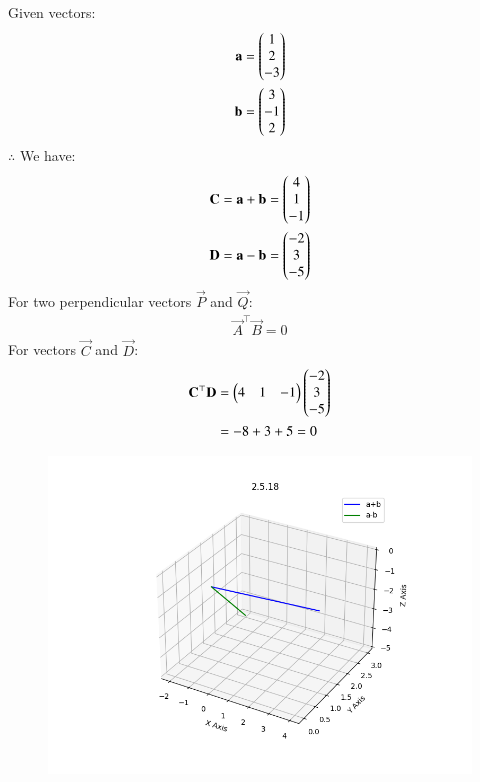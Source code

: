 \documentclass[journal,12pt,onecolumn]{IEEEtran}
\theoremstyle{remark}
\begin{document}
Given vectors:
\begin{align}
 \mathbf{a} &= \begin{pmatrix}1 \\ 2 \\ -3\end{pmatrix} \\
 \mathbf{b} &= \begin{pmatrix}3 \\ -1 \\ 2\end{pmatrix}
\end{align}
$\therefore$ We have:
\begin{align}
\mathbf{C} = \mathbf{a} + \mathbf{b} &= \begin{pmatrix}4 \\ 1 \\ -1\end{pmatrix} \\
\mathbf{D} = \mathbf{a} - \mathbf{b} &= \begin{pmatrix}-2 \\ 3 \\ -5\end{pmatrix}
\end{align}
For two perpendicular vectors $\vec{P}$ and $\vec{Q}$:
\begin{align}
 \vec{A}^\top\vec{B} = 0
\end{align}
For vectors $\vec{C}$ and $\vec{D}$:
\begin{align}
 \mathbf{C}^\top\mathbf{D} &= \begin{pmatrix}4 & 1 & -1\end{pmatrix}\begin{pmatrix}-2 \\ 3 \\ -5\end{pmatrix} \\
 &= -8 + 3 + 5 = 0
\end{align}
\begin{figure}[H]
    \centering
    \includegraphics{figs/plot.png}
    \caption*{}
    \label{fig:plot}
\end{figure}
\end{document}
